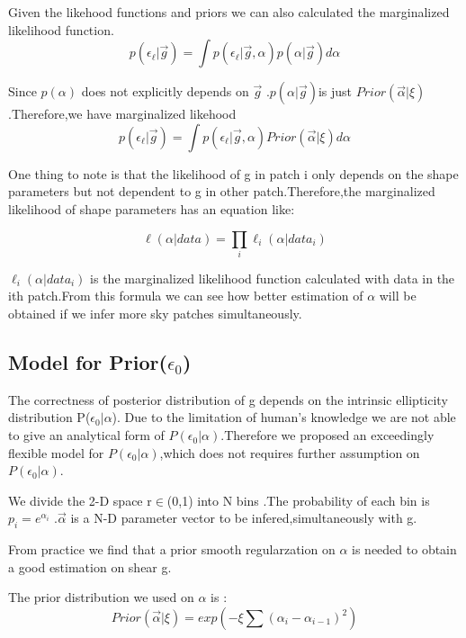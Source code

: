 \documentclass[useAMS,usenatbib]{mn2e}
\begin{document}
Given the likehood functions and priors we can also calculated the
marginalized likelihood function.
\begin{equation}
p(\epsilon_{\ell}|\vec{g})=\int p(\epsilon_{\ell}|\vec{g},\alpha)p(\alpha|\vec{g})d\alpha
\end{equation}


Since $p(\alpha)$ does not explicitly depends on $\vec{g}$ .$p(\alpha|\vec{g})$is
just $Prior(\vec{\alpha}|\xi)$.Therefore,we have marginalized likehood
\begin{equation}
p(\epsilon_{\ell}|\vec{g})=\int p(\epsilon_{\ell}|\vec{g},\alpha)Prior(\vec{\alpha}|\xi)d\alpha
\end{equation}


One thing to note is that the likelihood of g in patch i only depends
on the shape parameters but not dependent to g in other patch.Therefore,the
marginalized likelihood of shape parameters has an equation like:

\begin{equation}
\ell(\alpha|data)=\prod_{i}\ell_{i}(\alpha|data_{i})
\end{equation}


$\ell_{i}(\alpha|data_{i})$ is the marginalized likelihood function
calculated with data in the ith patch.From this formula we can see
how better estimation of $\alpha$ will be obtained if we infer more
sky patches simultaneously. 


\subsection{Model for Prior($\epsilon_{0}$)}

The correctness of posterior distribution of g depends on the intrinsic
ellipticity distribution P($\epsilon_{0}|\alpha$). Due to the limitation
of human's knowledge we are not able to give an analytical form of
$P(\epsilon_{0}|\alpha)$.Therefore we proposed an exceedingly flexible
model for $P(\epsilon_{0}|\alpha)$,which does not requires further
assumption on $P(\epsilon_{0}|\alpha)$.

We divide the 2-D space r$\in$(0,1) into N bins .The probability
of each bin is $p_{i}=e^{\alpha_{i}}$ .$\overrightarrow{\alpha}$
is a N-D parameter vector to be infered,simultaneously with g.

From practice we find that a prior smooth regularzation on $\alpha$
is needed to obtain a good estimation on shear g.

The prior distribution we used on $\alpha$ is : 
\begin{equation}
Prior(\vec{\alpha}|\xi)=exp(-\xi\sum(\alpha_{i}-\alpha_{i-1})^{2})
\end{equation}
\end{document}
